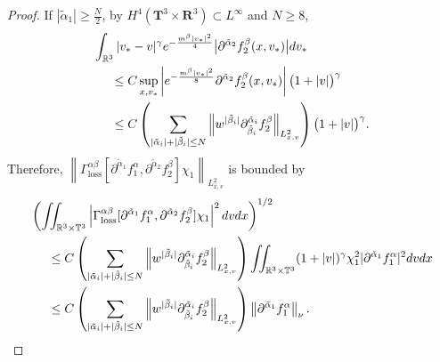 \documentclass[reqno]{amsart}
\numberwithin{equation}{section}
\numberwithin{equation}{section}
\begin{document}
\begin{proof}
		If $ |\tilde{\alpha}_1| \geq \frac{N}{2} $, by $ H^4(\mathbf{T}^3 \times \mathbf{R}^3) \subset L^\infty $ and $ N \geq 8 $,
		\begin{align*}
		&\int_{\mathbb{R}^3} |v_* - v|^\gamma e^{-\frac{m^{\beta}|v_*|^2}{4}} \big|\partial^{\tilde{\alpha}_2}f^{\beta}_2 (x,v_*)\big| dv_*\\
		&\hspace{0.5cm}\leq C \sup_{x, v_*} \left| e^{-\frac{m^{\beta}|v_*|^2}{8}} \partial^{\tilde{\alpha}_2}f^{\beta}_2 (x,v_*) \right| \big(1 + |v|\big)^\gamma\\
		&\hspace{0.5cm}\leq C  \left(\sum_{| \tilde{\alpha}_i |+| \tilde{\beta}_i | \le N} \left\| w^{| \tilde{\beta}_i |} \partial_{\tilde{\beta}_i}^{\tilde{\alpha}_i} f^{\beta}_2\right\|_{L^{2}_{x,v}}\right) \big(1 + |v|\big)^\gamma.
		\end{align*}
		Therefore, $\left\| \Gamma_{\text{loss}}^{\alpha \beta} [\partial^{\tilde{\alpha}_1}f^{\alpha}_1, \partial^{\tilde{\alpha}_2}f^{\beta}_2] \chi_1 \right\|_{L^{2}_{x,v}}$ is bounded by
		\begin{align*}
		&\left(\iint_{\mathbb{R}^3\times\mathbb{T}^3} \left| \Gamma_{\text{loss}}^{\alpha \beta} [\partial^{\tilde{\alpha}_1}f^{\alpha}_1, \partial^{\tilde{\alpha}_2}f^{\beta}_2] \chi_1 \right|^2 dv dx\right)^{1/2}\\
		&\hspace{0.5cm}\leq C \left(\sum_{| \tilde{\alpha}_i |+| \tilde{\beta}_i | \le N} \left\| w^{| \tilde{\beta}_i |} \partial_{\tilde{\beta}_i}^{\tilde{\alpha}_i} f^{\beta}_2\right\|_{L^{2}_{x,v}}\right) \iint_{\mathbb{R}^3\times\mathbb{T}^3} (1 + |v|)^{\gamma} \chi_1^2 |\partial^{\tilde{\alpha}_1}f^{\alpha}_1|^2 dv dx\\
		&\hspace{0.5cm}\leq C \left(\sum_{| \tilde{\alpha}_i |+| \tilde{\beta}_i | \le N} \left\| w^{| \tilde{\beta}_i |} \partial_{\tilde{\beta}_i}^{\tilde{\alpha}_i} f^{\beta}_2\right\|_{L^{2}_{x,v}}\right) \left\| \partial^{\tilde{\alpha}_1}f^{\alpha}_1 \right\|_\nu.
		\end{align*}
		

\end{proof}
\end{document}
